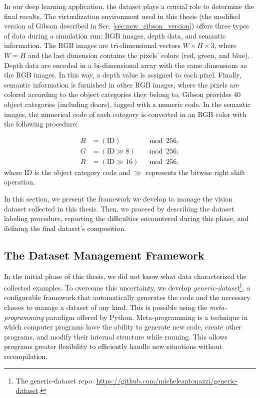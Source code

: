 In our deep learning application, the dataset plays a crucial role to determine the final results. The virtualization environment used in this thesis (the modified version of Gibson described in Sec. \ref{sec:new_gibson_version}) offers three types of data during a simulation run: RGB images, depth data, and semantic information. The RGB images are tri-dimensional vectors $W \times H \times 3$, where $W = H$ and the last dimension contains the pixels' colors (red, green, and blue). Depth data are encoded in a bi-dimensional array with the same dimensions as the RGB images. In this way, a depth value is assigned to each pixel. Finally, semantic information is furnished in other RGB images, where the pixels are colored according to the object categories they belong to. Gibson provides 40 object categories (including doors), tagged with a numeric code. In the semantic images, the numerical code of each category is converted in an RGB color with the following procedure:

\begin{equation}
\label{eq:pareto mle2}
\begin{aligned}
B &= (\text{ID}) &\mod 256, \\
G &= (\text{ID} \gg 8) &\mod 256, \\
R &= (\text{ID} \gg 16) &\mod 256,
\end{aligned}
\end{equation}
where ID is the object category code and $\gg$ represents the bitwise right shift operation. 

In this section, we present the framework we develop to manage the vision dataset collected in this thesis. Then, we proceed by describing the dataset labeling procedure, reporting the difficulties encountered during this phase, and defining the final dataset's composition.

\subsection{The Dataset Management Framework}
\label{sec:generic_dataset}
In the initial phase of this thesis, we did not know what data characterized the collected examples. To overcome this uncertainty, we develop \textit{generic-dataset}\footnote{The generic-dataset repo: \url{https://github.com/micheleantonazzi/generic-dataset}.}, a configurable framework that automatically generates the code and the necessary classes to manage a dataset of any kind. This is possible using the \textit{meta-programming} paradigm offered by Python. Meta-programming is a technique in which computer programs have the ability to generate new code, create other programs, and modify their internal structure while running. This allows programs greater flexibility to efficiently handle new situations without recompilation. 

